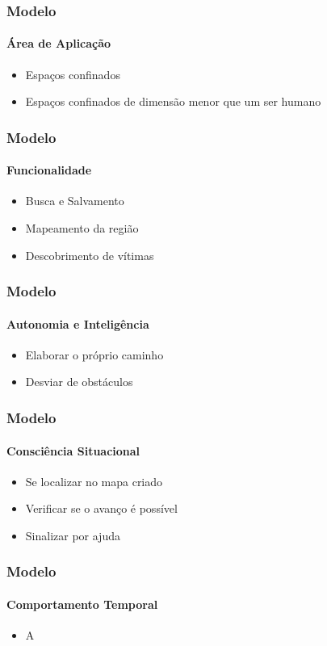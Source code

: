 \documentclass[aspectratio=169]{beamer}
\begin{document}
\begin{frame}
\frametitle{Modelo}
\framesubtitle{Área de Aplicação}
\begin{itemize}
\item Espaços confinados
\item Espaços confinados de dimensão menor que um ser humano
\end{itemize}
\end{frame}

\begin{frame}
\frametitle{Modelo}
\framesubtitle{Funcionalidade}
\begin{itemize}
\item Busca e Salvamento
\item Mapeamento da região
\item Descobrimento de vítimas
\end{itemize}
\end{frame}

\begin{frame}
\frametitle{Modelo}
\framesubtitle{Autonomia e Inteligência}
\begin{itemize}
\item Elaborar o próprio caminho
\item Desviar de obstáculos
\end{itemize}
\end{frame}

\begin{frame}
\frametitle{Modelo}
\framesubtitle{Consciência Situacional}
\begin{itemize}
\item Se localizar no mapa criado
\item Verificar se o avanço é possível
\item Sinalizar por ajuda
\end{itemize}
\end{frame}

\begin{frame}
\frametitle{Modelo}
\framesubtitle{Comportamento Temporal}
\begin{itemize}
\item A
\end{itemize}
\end{frame}
\end{document}
